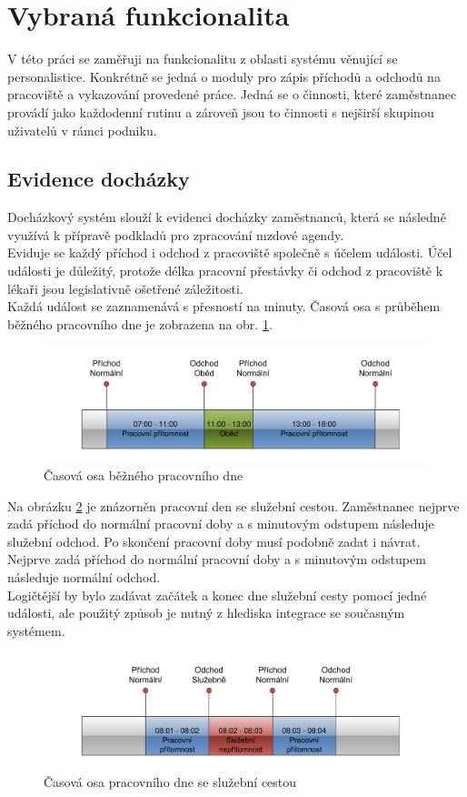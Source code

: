 \documentclass{diplomka}
\begin{document}
\section{Vybraná funkcionalita}
V této práci se zaměřuji na funkcionalitu z oblasti systému věnující se personalistice. Konkrétně se jedná o moduly pro zápis příchodů a odchodů na pracoviště a vykazování provedené práce. Jedná se o činnosti, které zaměstnanec provádí jako každodenní rutinu a zároveň jsou to činnosti s nejširší skupinou uživatelů v rámci podniku.
 
\subsection{Evidence docházky}
Docházkový systém slouží k evidenci docházky zaměstnanců, která se následně využívá k přípravě podkladů pro zpracování mzdové agendy.\\ \indent
Eviduje se každý příchod i odchod z pracoviště společně s účelem události. Účel události je důležitý, protože délka pracovní přestávky či odchod z pracoviště k lékaři jsou legislativně ošetřené záležitosti.\\ \indent Každá událost se zaznamenává s přesností na minuty. Časová osa s průběhem běžného pracovního dne je zobrazena na obr. \ref{fig:attn}.
\begin{figure}[H]
  \centering
  \includegraphics[scale=0.7]{visio/attnormal.pdf}
\caption{Časová osa běžného pracovního dne}
\label{fig:attn}
\end{figure}

Na obrázku \ref{fig:atts} je znázorněn pracovní den se služební cestou. Zaměstnanec nejprve zadá příchod do normální pracovní doby a s minutovým odstupem následuje služební odchod. Po skončení pracovní doby musí podobně zadat i návrat. Nejprve zadá příchod do normální pracovní doby a s minutovým odstupem následuje normální odchod.\\ \indent Logičtější by bylo zadávat začátek a konec dne služební cesty pomocí jedné události, ale použitý způsob je nutný z hlediska integrace se současným systémem.
\begin{figure}[H]
  \centering
  \includegraphics[scale=0.7]{visio/attservice.pdf}
\caption{Časová osa pracovního dne se služební cestou}
\label{fig:atts}
\end{figure}
\end{document}
